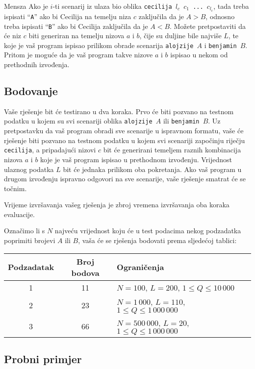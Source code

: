 \begin{statement}[
  problempoints=100,
  timelimit=5 sekundi,
  memorylimit=512 MiB,
]{Mensza}
Ako je $i$-ti scenarij iz ulaza bio oblika \texttt{cecilija $l_c$ $c_1$ ...
$c_{l_c}$}, tada treba ispisati ``\texttt{A}'' ako bi Cecilija na temelju niza
$c$ zaključila da je $A > B$, odnosno treba ispisati ``\texttt{B}'' ako bi Cecilija
zaključila da je $A < B$. Možete pretpostaviti da će niz $c$ biti generiran na
temelju nizova $a$ i $b$, čije su duljine bile najviše $L$, te  koje je vaš
program ispisao prilikom obrade scenarija \texttt{alojzije $A$} i
\texttt{benjamin $B$}. Pritom je moguće da je vaš program takve nizove $a$ i $b$
ispisao u nekom od prethodnih izvođenja.

\subsection*{Bodovanje}
Vaše rješenje bit će testirano u dva koraka. Prvo će biti pozvano na testnom
podatku u kojem su svi scenariji oblika \texttt{alojzije $A$} ili
\texttt{benjamin $B$}. Uz pretpostavku da vaš program obradi sve scenarije u
ispravnom formatu, vaše će rješenje biti pozvano na testnom podatku u kojem
svi scenariji započinju riječju \texttt{cecilija}, a pripadajući nizovi $c$
bit će generirani temeljem raznih kombinacija nizova $a$ i $b$ koje je vaš
program ispisao u prethodnom izvođenju. Vrijednost ulaznog podatka $L$ bit će
jednaka prilikom oba pokretanja. Ako vaš program u drugom izvođenju ispravno
odgovori na sve scenarije, vaše rješenje smatrat će se točnim.

Vrijeme izvršavanja vašeg rješenja je zbroj vremena izvršavanja
oba koraka evaluacije.

Označimo li s $N$ najveću vrijednost koju će u test podacima nekog podzadatka
poprimiti brojevi $A$ ili $B$, vaša će se rješenja bodovati prema sljedećoj
tablici:

{\renewcommand{\arraystretch}{1.4}
  \setlength{\tabcolsep}{6pt}
  \begin{tabular}{ccl}
   Podzadatak & Broj bodova & Ograničenja \\ \midrule
    1 & 11 & $N = 100$, $L = 200$, $1 \le Q \le 10\,000$ \\
    2 & 23 & $N = 1\,000$, $L = 110$, $1 \le Q \le 1\,000\,000$ \\
    3 & 66 & $N = 500\,000$, $L = 20$, $1 \le Q \le 1\,000\,000$
\end{tabular}}

\subsection*{Probni primjer}

\end{statement}

